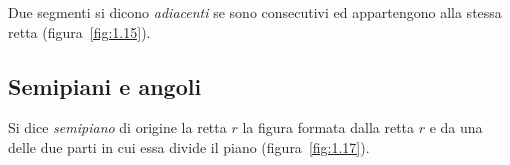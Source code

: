 \begin{inaccessibleblock}
 \begin{center} \end{center}
\end{inaccessibleblock}

\begin{definizione}
Due segmenti si dicono \emph{adiacenti} se sono consecutivi ed 
appartengono alla stessa retta (figura~\ref{fig:1.15}).
\end{definizione}

\begin{inaccessibleblock}
 \begin{center} \end{center}
\end{inaccessibleblock}


\subsection{Semipiani e angoli}

\begin{definizione}
Si dice \emph{semipiano} di origine la retta \(r\) la figura formata 
dalla retta \(r\) e da una delle due parti in cui essa divide il piano 
(figura~\ref{fig:1.17}).
\end{definizione}

